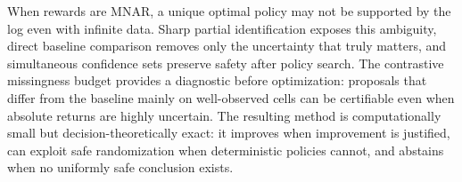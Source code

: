 \documentclass[letterpaper]{article}
\theoremstyle{remark}
\begin{document}
When rewards are MNAR, a unique optimal policy may not be supported by the log even with infinite data. Sharp partial identification exposes this ambiguity, direct baseline comparison removes only the uncertainty that truly matters, and simultaneous confidence sets preserve safety after policy search. The contrastive missingness budget provides a diagnostic before optimization: proposals that differ from the baseline mainly on well-observed cells can be certifiable even when absolute returns are highly uncertain. The resulting method is computationally small but decision-theoretically exact: it improves when improvement is justified, can exploit safe randomization when deterministic policies cannot, and abstains when no uniformly safe conclusion exists.
\label{content:end}

\ifAAAIFormat
\else
  
\fi

\end{document}
